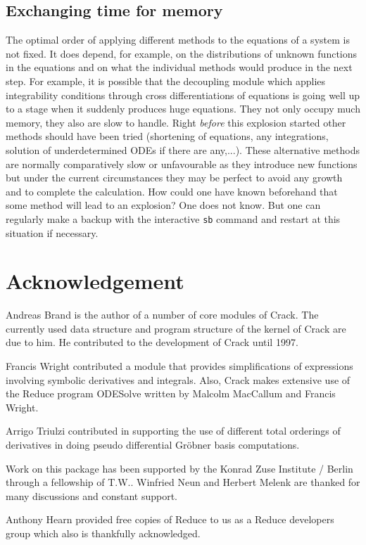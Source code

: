 \documentclass[12pt]{article}
\begin{document}
\subsection{Exchanging time for memory}
The optimal order of applying different methods to the equations of a system
is not fixed. It does depend, for example, on the distributions of
unknown functions in the 
equations and on what the individual methods would produce in the next
step. For example, it is possible that the
decoupling module which applies integrability conditions through cross
differentiations of equations is going well up to a stage when it
suddenly produces huge equations. They not only occupy much memory,
they also are slow to handle.
Right {\em before} this explosion started other methods should
have been tried (shortening of equations, any integrations, solution of
underdetermined ODEs if there are any,...). These alternative methods are normally
comparatively slow or unfavourable as they introduce new functions but
under the current circumstances they may be perfect to avoid any growth
and to complete the calculation. How could one have known beforehand that some
method will lead to an explosion? One does not know. But one can
regularly make a backup with the interactive {\tt sb} command and
restart at this situation if necessary.

\section*{Acknowledgement}
Andreas Brand is the author of a number of core modules of {\sc
Crack}. The currently used data structure and program structure of the
kernel of {\sc Crack} are due to him. He contributed to the
development of {\sc Crack} until 1997.

Francis Wright contributed a module that provides simplifications
of expressions involving symbolic derivatives and integrals. Also, {\sc Crack}
makes extensive use of the {\sc Reduce} program {\sc ODESolve} written
by Malcolm MacCallum and Francis Wright.

Arrigo Triulzi contributed in supporting the use of different total
orderings of derivatives in doing pseudo differential Gr\"{o}bner
basis computations.

Work on this package has been supported by the Konrad Zuse
Institute / Berlin through a fellowship of T.W..  Winfried
Neun and Herbert Melenk are thanked for many discussions and 
constant support.

Anthony Hearn provided free copies of {\sc Reduce} to us as a
{\sc Reduce} developers group which also is thankfully acknowledged.
\end{document}

